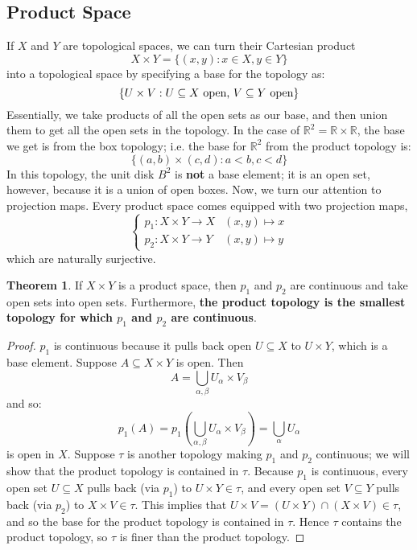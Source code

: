 \documentclass[11pt, oneside]{amsart}   	%
\theoremstyle{definition}
\newtheorem{theorem}{Theorem}[section]
\begin{document}
	\subsection{Product Space}
	
	If $X$ and $Y$ are topological spaces, we can turn their Cartesian product 
	$$
		X\times Y = \{(x, y) : x\in X, y\in Y\}
	$$
	into a topological space by specifying a base for the topology as:
	$$
		\{U\times V : U\subseteq X\textnormal{ open, } V\subseteq Y\textnormal{ open}\}
	$$
	Essentially, we take products of all the open sets as our base, and then union them to get all the open sets in the topology. In the case of $\mathbb R^2 = 
	\mathbb R\times\mathbb R$, the base we get is from the box topology; i.e. the base for $\mathbb R^2$ from the product topology is:
	$$
		\{(a, b)\times (c, d) : a < b, c < d\}
	$$
	In this topology, the unit disk $B^2$ is \textbf{not} a base element; it is an open set, however, because it is a union of open boxes. Now, we turn our attention 
	to projection maps. Every product space comes equipped with two projection maps, 
	$$
	\begin{cases}
		p_1 : X\times Y\rightarrow X & (x, y)\mapsto x \\
		p_2 : X\times Y\rightarrow Y & (x, y)\mapsto y
	\end{cases}
	$$ 
	which are naturally surjective.
	
	\begin{theorem}
		If $X\times Y$ is a product space, then $p_1$ and $p_2$ are continuous and take open sets into open sets. Furthermore, \textbf{the product topology 
		is the smallest topology for which $p_1$ and $p_2$ are continuous}.
	\end{theorem}
	
	\begin{proof}
		$p_1$ is continuous because it pulls back open $U\subseteq X$ to $U\times Y$, which is a base element. Suppose $A\subseteq X\times Y$ is open. 
		Then
		$$
			A = \bigcup_{\alpha, \beta}U_\alpha\times V_\beta
		$$
		and so:
		$$
			p_1(A) = p_1(\bigcup_{\alpha, \beta}U_\alpha\times V_\beta) = \bigcup_\alpha U_\alpha
		$$ 
		is open in $X$. Suppose $\tau$ is another topology making $p_1$ and $p_2$ continuous; we will show that the product topology is contained in 
		$\tau$. Because $p_1$ is continuous, every open set $U\subseteq X$ pulls back (via $p_1$) to $U\times Y\in \tau$, and every open set $V\subseteq 
		Y$ pulls back (via $p_2$) to $X\times V\in\tau$. This implies that $U\times V = (U\times Y)\cap (X\times V)\in\tau$, and so the base for the product 
		topology is contained in $\tau$. Hence $\tau$ contains the product topology, so $\tau$ is finer than the product topology.
	\end{proof}
	
\end{document}
